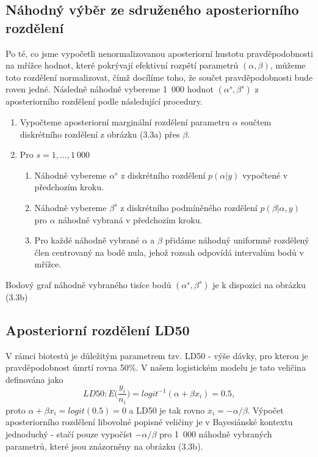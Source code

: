 \subsection{Náhodný výběr ze sdruženého aposteriorního rozdělení}

Po té, co jsme vypočetli nenormalizovanou aposteriorní hustotu pravděpodobnosti na mřížce hodnot, které pokrývají efektivní rozpětí parametrů $(\alpha, \beta)$, můžeme toto rozdělení normalizovat, čímž docílíme toho, že součet pravděpodobnosti bude roven jedné. Následně náhodně vybereme 1~000 hodnot $(\alpha^s, \beta^s)$ z aposteriorního rozdělení podle následující procedury.
\begin{enumerate}
\item Vypočteme aposteriorní marginální rozdělení parametru $\alpha$ součtem diskrétního rozdělení z obrázku (3.3a) přes $\beta$.
\item Pro $s = 1, ..., 1~000$
\begin{enumerate}
\item Náhodně vybereme $\alpha^s$ z diskrétního rozdělení $p(\alpha | y)$ vypočtené v předchozím kroku.
\item Náhodně vybereme $\beta^s$ z diskrétního podmíněného rozdělení $p(\beta | \alpha, y)$ pro $\alpha$ náhodně vybraná v předchozím kroku.
\item Pro každé náhodně vybrané $\alpha$ a $\beta$ přidáme náhodný uniformně rozdělený člen centrovaný na bodě nula, jehož rozsah odpovídá intervalům bodů v mřížce.
\end{enumerate}
\end{enumerate}
Bodový graf náhodně vybraného tisíce bodů $(\alpha^s, \beta^s)$ je k dispozici na obrázku (3.3b)

\subsection{Aposteriorní rozdělení LD50}

V rámci biotestů je důležitým parametrem tzv. LD50 - výše dávky, pro kterou je pravděpodobnost úmrtí rovna 50\%. V našem logistickém modelu je tato veličina definována jako
\begin{equation}
LD50: E\Big(\frac{y_i}{n_i}\Big) = logit^{-1}(\alpha + \beta x_i) = 0.5,
\end{equation}
proto $\alpha + \beta x_i = logit(0.5) = 0$ a LD50 je tak rovno $x_i = -\alpha / \beta$. Výpočet aposteriorního rozdělení libovolné popisné veličiny je v Bayesiánské kontextu jednoduchý - stačí pouze vypočíst $-\alpha / \beta$ pro 1~000 náhodně vybraných parametrů, které jsou znázorněny na obrázku (3.3b).

